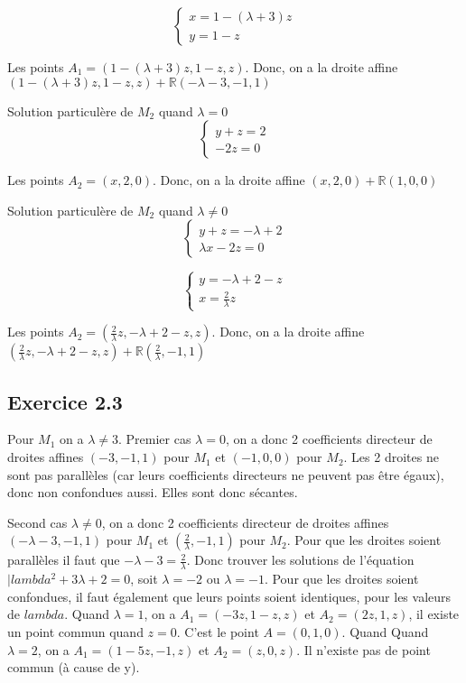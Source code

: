 \documentclass[]{book}
\theoremstyle{definition}
\newcommand{\bb}[1]{\mathbb{#1}}
\newcommand{\R}{\bb{R}}
\begin{document}
$$
\left\{ 
    \begin{array}{l}
        x  = 1 - (\lambda + 3) z\\
         y = 1-z
    \end{array}
\right.
$$

Les points $A_1 = (1 - (\lambda + 3) z, 1-z, z)$. Donc, on a la droite affine $(1 - (\lambda + 3) z, 1-z, z) + \R(-\lambda -3, -1, 1)$

Solution particul\`ere de $M_2$ quand $\lambda = 0$
$$
\left\{ 
    \begin{array}{l}
        y+z  = 2\\
        -2z = 0
    \end{array}
\right.
$$

Les points $A_2 = (x,2,0)$. Donc, on a la droite affine $(x,2,0) + \R(1,0,0)$


Solution particul\`ere de $M_2$ quand $\lambda \neq 0$
$$
\left\{ 
    \begin{array}{l}
        y+z  = -\lambda + 2\\
        \lambda x -2z = 0
    \end{array}
\right.
$$

$$
\left\{ 
    \begin{array}{l}
        y = -\lambda + 2 - z\\
        x = \frac{2}{\lambda}z
    \end{array}
\right.
$$

Les points $A_2 = (\frac{2}{\lambda}z,-\lambda + 2 - z,z)$. Donc, on a la droite affine $(\frac{2}{\lambda}z,-\lambda + 2 - z,z) + \R(\frac{2}{\lambda},-1,1)$


\subsection*{Exercice 2.3}
Pour $M_1$ on a $\lambda \neq 3$. Premier cas $\lambda = 0$, on a donc 2 coefficients directeur de droites affines $(-3, -1, 1)$ pour $M_1$ et $(-1, 0, 0)$ pour $M_2$. Les 2 droites ne sont pas parall\`eles (car leurs coefficients directeurs ne peuvent pas \^etre \'egaux), donc non confondues aussi. Elles sont donc s\'ecantes.

Second cas $\lambda \neq 0$, on a donc 2 coefficients directeur de droites affines $(-\lambda -3, -1, 1)$ pour $M_1$ et $(\frac{2}{\lambda}, -1, 1)$ pour $M_2$. Pour que les droites soient parall\`eles il faut que $-\lambda -3 = \frac{2}{\lambda}$. Donc trouver les solutions de l'\'equation $|lambda^2 + 3\lambda + 2 = 0$, soit $\lambda = -2$ ou $\lambda = -1$. Pour que les droites soient confondues, il faut \'egalement que leurs points soient identiques, pour les valeurs de $lambda$. Quand $\lambda = 1$, on a $A_1 = (-3z,1-z,z)$ et $A_2 = (2z,1,z)$, il existe un point commun quand $z=0$. C'est le point $A=(0,1,0)$. Quand Quand $\lambda = 2$, on a $A_1 = (1-5z,-1,z)$ et $A_2 = (z,0,z)$. Il n'existe pas de point commun (\`a cause de y).
\end{document}
